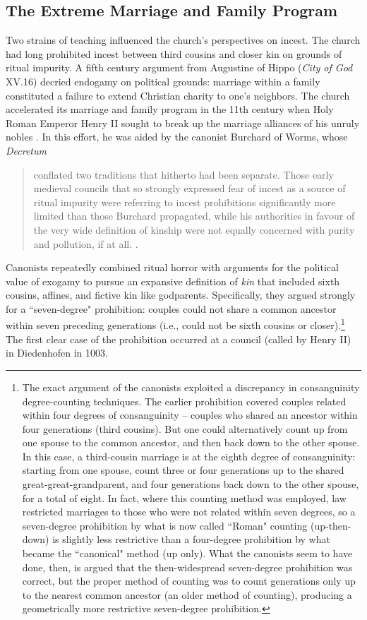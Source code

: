 \documentclass[12pt]{article}
\theoremstyle{definition}
\theoremstyle{remark}
\begin{document}
\subsection{The Extreme Marriage and Family Program}
Two strains of teaching influenced the church's perspectives on incest. The church had long prohibited incest between third cousins and closer kin on grounds of ritual impurity. A fifth century argument from Augustine of Hippo (\textit{City of God} XV.16) decried endogamy on political grounds: marriage within a family constituted a failure to extend Christian charity to one's neighbors. The church accelerated its marriage and family program in the 11th century when Holy Roman Emperor Henry II sought to break up the marriage alliances of his unruly nobles \citep{ubl_2008}. In this effort, he was aided by the canonist Burchard of Worms, whose \textit{Decretum}
\begin{quote}
conflated two traditions that hitherto had been separate. Those early medieval councils that so strongly expressed fear of incest as a source of ritual impurity were referring to incest prohibitions significantly more limited than those Burchard propagated, while his authorities in favour of the very wide definition of kinship were not equally concerned with purity and pollution, if at all. \citep[154]{rolker_2012}.
\end{quote}
Canonists repeatedly combined ritual horror with arguments for the political value of exogamy to pursue an expansive definition of \textit{kin} that included sixth cousins, affines, and fictive kin like godparents. Specifically, they argued strongly for a ``seven-degree" prohibition: couples could not share a common ancestor within seven preceding generations (i.e., could not be sixth cousins or closer).\footnote{The exact argument of the canonists exploited a discrepancy in consanguinity degree-counting techniques. The earlier prohibition covered couples related within four degrees of consanguinity -- couples who shared an ancestor within four generations (third cousins). But one could alternatively count up from one spouse to the common ancestor, and then back down to the other spouse. In this case, a third-cousin marriage is at the eighth degree of consanguinity: starting from one spouse, count three or four generations up to the shared great-great-grandparent, and four generations back down to the other spouse, for a total of eight. In fact, where this counting method was employed, law restricted marriages to those who were not related within seven degrees, so a seven-degree prohibition by what is now called ``Roman" counting (up-then-down) is slightly less restrictive than a four-degree prohibition by what became the ``canonical" method (up only). What the canonists seem to have done, then, is argued that the then-widespread seven-degree prohibition was correct, but the proper method of counting was to count generations only up to the nearest common ancestor (an older method of counting), producing a geometrically more restrictive seven-degree prohibition.} The first clear case of the prohibition occurred at a council (called by Henry II) in Diedenhofen in 1003.
\end{document}
